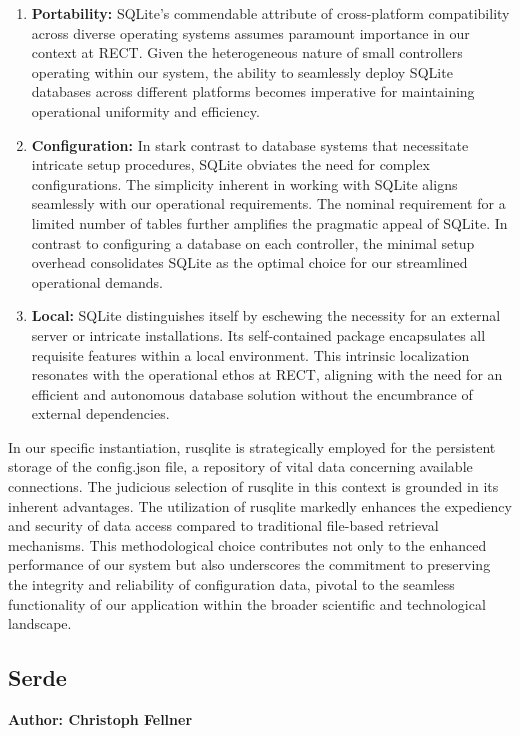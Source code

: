 \begin{enumerate}
    \item \textbf{Portability:} SQLite's commendable attribute of cross-platform compatibility across diverse operating systems assumes paramount importance in 
    our context at RECT. Given the heterogeneous nature of small controllers operating within our system, the ability to seamlessly deploy SQLite databases 
    across different platforms becomes imperative for maintaining operational uniformity and efficiency.
    
    \item \textbf{Configuration:} In stark contrast to database systems that necessitate intricate setup procedures, SQLite obviates the need for complex 
    configurations. The simplicity inherent in working with SQLite aligns seamlessly with our operational requirements. The nominal requirement for a limited 
    number of tables further amplifies the pragmatic appeal of SQLite. In contrast to configuring a database on each controller, the minimal setup overhead 
    consolidates SQLite as the optimal choice for our streamlined operational demands.
    
    \item \textbf{Local:} SQLite distinguishes itself by eschewing the necessity for an external server or intricate installations. Its self-contained package 
    encapsulates all requisite features within a local environment. This intrinsic localization resonates with the operational ethos at RECT, aligning with the 
    need for an efficient and autonomous database solution without the encumbrance of external dependencies.
\end{enumerate}

In our specific instantiation, rusqlite is strategically employed for the persistent storage of the config.json file, a repository of vital data concerning 
available connections. The judicious selection of rusqlite in this context is grounded in its inherent advantages. The utilization of rusqlite markedly enhances 
the expediency and security of data access compared to traditional file-based retrieval mechanisms. This methodological choice contributes not only to the 
enhanced performance of our system but also underscores the commitment to preserving the integrity and reliability of configuration data, pivotal to the seamless
functionality of our application within the broader scientific and technological landscape.

\subsection{Serde}
\textbf{Author: Christoph Fellner}

